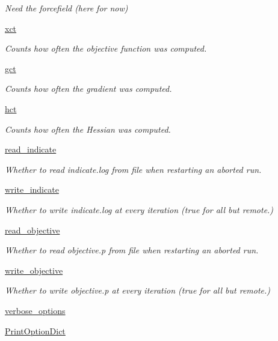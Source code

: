 \begin{DoxyCompactItemize}
\begin{DoxyCompactList}\small\item\em Need the forcefield (here for now) \end{DoxyCompactList}\item 
\hyperlink{classforcebalance_1_1target_1_1Target_aad2e385cfbf7b4a68f1c2cb41133fe82}{xct}
\begin{DoxyCompactList}\small\item\em Counts how often the objective function was computed. \end{DoxyCompactList}\item 
\hyperlink{classforcebalance_1_1target_1_1Target_aa625ac88c6744eb14ef281d9496d0dbb}{gct}
\begin{DoxyCompactList}\small\item\em Counts how often the gradient was computed. \end{DoxyCompactList}\item 
\hyperlink{classforcebalance_1_1target_1_1Target_a5b5a42f78052b47f29ed4b940c6111a1}{hct}
\begin{DoxyCompactList}\small\item\em Counts how often the Hessian was computed. \end{DoxyCompactList}\item 
\hyperlink{classforcebalance_1_1target_1_1Target_aa8af57d5be669c4bb1c0cfd4b7a9220e}{read\-\_\-indicate}
\begin{DoxyCompactList}\small\item\em Whether to read indicate.\-log from file when restarting an aborted run. \end{DoxyCompactList}\item 
\hyperlink{classforcebalance_1_1target_1_1Target_a3a2f5d4bbb8d6ecb580eadb261977a57}{write\-\_\-indicate}
\begin{DoxyCompactList}\small\item\em Whether to write indicate.\-log at every iteration (true for all but remote.) \end{DoxyCompactList}\item 
\hyperlink{classforcebalance_1_1target_1_1Target_a22bdc4bbce2020ae44b44ad3e444fda6}{read\-\_\-objective}
\begin{DoxyCompactList}\small\item\em Whether to read objective.\-p from file when restarting an aborted run. \end{DoxyCompactList}\item 
\hyperlink{classforcebalance_1_1target_1_1Target_a7a95624dfe03f0cee0e5f1ae09db306a}{write\-\_\-objective}
\begin{DoxyCompactList}\small\item\em Whether to write objective.\-p at every iteration (true for all but remote.) \end{DoxyCompactList}\item 
\hyperlink{classforcebalance_1_1BaseClass_afd68efa29ccd2f320f4cf82198214aac}{verbose\-\_\-options}
\item 
\hyperlink{classforcebalance_1_1BaseClass_afc6659278497d7245bc492ecf405ccae}{Print\-Option\-Dict}
\end{DoxyCompactItemize}


